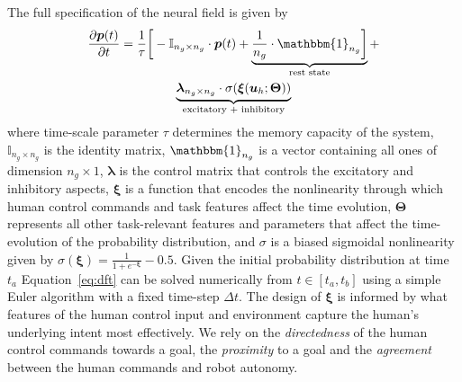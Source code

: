 \documentclass[conference]{IEEEtran}
\begin{document}
The full specification of the neural field is given by
\begin{multline}\label{eq:dft}
\frac{\partial \boldsymbol{p}(t)}{\partial t} = \frac{1}{\tau}\bigg[-\mathbb{I}_{n_g\times n_g}\cdot\boldsymbol{p}(t) + \underbrace{\frac{1}{n_g}\cdot\mathbbm{1}_{n_g}\bigg]}_{\text{rest state}} + \\ \underbrace{\boldsymbol{\lambda}_{n_g\times n_g}\cdot\sigma(\boldsymbol{\xi}(\boldsymbol{u}_h;\boldsymbol{\Theta}))}_{\text{excitatory + inhibitory}}
\end{multline}
where time-scale parameter $\tau$ determines the memory capacity of the system, $\mathbb{I}_{n_g\times n_g}$ is the identity matrix, $\mathbbm{1}_{n_g}$ is a vector containing all ones of dimension $n_g \times 1$, $\boldsymbol{\lambda}$ is the control matrix that controls the excitatory and inhibitory aspects, $\boldsymbol{\xi}$ is a function that encodes the nonlinearity through which human control commands and task features affect the time evolution, $\boldsymbol{\Theta}$ represents all other task-relevant features and parameters that affect the time-evolution of the probability distribution, and $\sigma$ is a biased sigmoidal nonlinearity given by $\sigma(\boldsymbol{\xi}) = \frac{1}{1 + e^{-\boldsymbol{\xi}}} - 0.5$. 
Given the initial probability distribution at time $t_a$ Equation~\ref{eq:dft} can be solved numerically from $t \in [t_a, t_b]$ using a simple Euler algorithm with a fixed time-step $\Delta t$. The design of $\boldsymbol{\xi}$ is informed by what features of the human control input and environment capture the human's underlying intent most effectively. We rely on the \textit{directedness} of the human control commands towards a goal, the \textit{proximity} to a goal and the \textit{agreement} between the human commands and robot autonomy.
\end{document}

